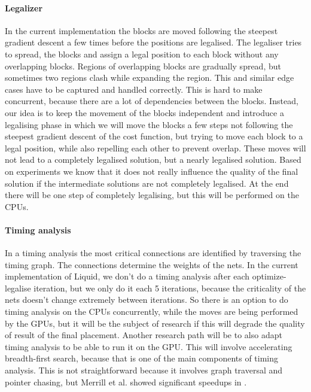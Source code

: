\documentclass[a4paper,oneside,12pt]{article}
\begin{document}

\paragraph{Legalizer}
In the current implementation the blocks are moved following the steepest gradient descent a few times before the positions are legalised. The legaliser tries to spread, the blocks and assign a legal position to each block without any overlapping blocks. Regions of overlapping blocks are gradually spread, but sometimes two regions clash while expanding the region. This and similar edge cases have to be captured and handled correctly. This is hard to make concurrent, because there are a lot of dependencies between the blocks. 
Instead, our idea is to keep the movement of the blocks independent and introduce a legalising phase in which we will move the blocks a few steps not following the steepest gradient descent of the cost function, but trying to move each block to a legal position, while also repelling each other to prevent overlap. These moves will not lead to a completely legalised solution, but a nearly legalised solution. Based on experiments we know that it does not really influence the quality of the final solution if the intermediate solutions are not completely legalised.  At the end there will be one step of completely legalising, but this will be performed on the CPUs.

\paragraph{Timing analysis}
In a timing analysis the most critical connections are identified by traversing the timing graph. The connections determine the weights of the nets.
In the current implementation of {\sc Liquid}, we don't do a timing analysis after each optimize-legalise iteration, but we only do it each 5 iterations, because the criticality of the nets doesn't change extremely between iterations. 
So there is an option to do timing analysis on the CPUs concurrently, while the moves are being performed by the GPUs, but it will be the subject of research if this will degrade the quality of result of the final placement.
Another research path will be to also adapt timing analysis to be able to run it on the GPU. This will involve accelerating breadth-first search, because that is one of the main components of timing analysis. This is not straightforward because it involves graph traversal and pointer chasing, but Merrill et al. showed significant speedups in \cite{Merrill2015}.
\end{document}
